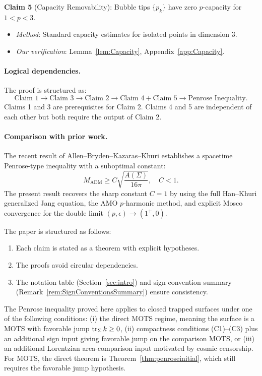 \begin{center}
{\begin{minipage}{0.95\textwidth}
\textbf{Claim 5} (Capacity Removability): Bubble tips $\{p_k\}$ have zero $p$-capacity for $1 < p < 3$.
\begin{itemize}
    \item \emph{Method}: Standard capacity estimates for isolated points in dimension 3.
    \item \emph{Our verification}: Lemma~\ref{lem:Capacity}, Appendix~\ref{app:Capacity}.
\end{itemize}
\end{minipage}}
\end{center}

\paragraph{Logical dependencies.} The proof is structured as:
\[
\text{Claim 1} \to \text{Claim 3} \to \text{Claim 2} \to \text{Claim 4} + \text{Claim 5} \to \text{Penrose Inequality}.
\]
Claims 1 and 3 are prerequisites for Claim 2. Claims 4 and 5 are independent of each other but both require the output of Claim 2.

\paragraph{Comparison with prior work.} The recent result of Allen--Bryden--Kazaras--Khuri \cite{allenbrydenkazaraskhuri2025} establishes a spacetime Penrose-type inequality with a suboptimal constant:
\[
M_{\mathrm{ADM}} \ge C \sqrt{\frac{A(\Sigma)}{16\pi}}, \quad C < 1.
\]
The present result recovers the sharp constant $C = 1$ by using the full Han--Khuri generalized Jang equation, the AMO $p$-harmonic method, and explicit Mosco convergence for the double limit $(p, \epsilon) \to (1^+, 0)$.

\begin{remark}[Structure]\label{rem:IndependentVerification}
The paper is structured as follows:
\begin{enumerate}
    \item Each claim is stated as a theorem with explicit hypotheses.
    \item The proofs avoid circular dependencies.
    \item The notation table (Section~\ref{sec:intro}) and sign convention summary (Remark~\ref{rem:SignConventionsSummary}) ensure consistency.
\end{enumerate}
\end{remark}

\medskip
The Penrose inequality proved here applies to closed trapped surfaces under one of the following conditions: (i) the direct MOTS regime, meaning the surface is a MOTS with favorable jump $\operatorname{tr}_\Sigma k \ge 0$, (ii) compactness conditions (C1)--(C3) plus an additional sign input giving favorable jump on the comparison MOTS, or (iii) an additional Lorentzian area-comparison input motivated by cosmic censorship. For MOTS, the direct theorem is Theorem~\ref{thm:penroseinitial}, which still requires the favorable jump hypothesis.

